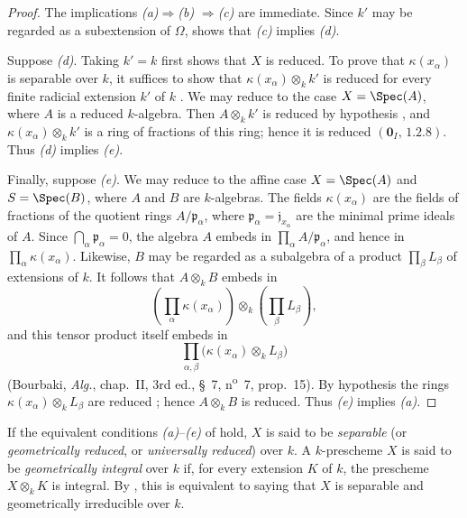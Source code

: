 \begin{proof}
The implications \emph{(a)}$\Rightarrow$\emph{(b)}
$\Rightarrow$\emph{(c)} are immediate.
Since $k'$ may be regarded as a subextension of $\Omega$,
 shows that \emph{(c)} implies \emph{(d)}.

Suppose \emph{(d)}.
Taking $k'=k$ first shows that $X$ is reduced.
To prove that $\kappa(x_\alpha)$ is separable over $k$, it suffices to
show that $\kappa(x_\alpha)\otimes_k k'$ is reduced for every finite
radicial extension $k'$ of $k$ .
We may reduce to the case $X=\Spec(A)$, where $A$ is a reduced
$k$-algebra.
Then $A\otimes_k k'$ is reduced by hypothesis , and
$\kappa(x_\alpha)\otimes_k k'$ is a ring of fractions of this ring;
hence it is reduced $(\mathbf{0}_I,\,1.2.8)$.
Thus \emph{(d)} implies \emph{(e)}.

Finally, suppose \emph{(e)}.
We may reduce to the affine case
$X=\Spec(A)$ and $S=\Spec(B)$, where $A$ and $B$ are $k$-algebras.
The fields $\kappa(x_\alpha)$ are the fields of fractions of the
quotient rings $A/\mathfrak p_\alpha$, where
$\mathfrak p_\alpha=\mathfrak j_{x_\alpha}$ are the minimal prime
ideals of $A$.
Since $\bigcap_\alpha\mathfrak p_\alpha=0$, the algebra $A$ embeds in
$\prod_\alpha A/\mathfrak p_\alpha$, and hence in
$\prod_\alpha\kappa(x_\alpha)$.
Likewise, $B$ may be regarded as a subalgebra of a product
$\prod_\beta L_\beta$ of extensions of $k$.
It follows that $A\otimes_k B$ embeds in
\[
 \left(\prod_\alpha\kappa(x_\alpha)\right)
 \otimes_k
 \left(\prod_\beta L_\beta\right),
\]
and this tensor product itself embeds in
\[
 \prod_{\alpha,\beta}
 \bigl(\kappa(x_\alpha)\otimes_k L_\beta\bigr)
\]
(Bourbaki, \emph{Alg.}, chap.~II, 3rd ed., \S~7,
n\textsuperscript{o}~7, prop.~15).
By hypothesis the rings
$\kappa(x_\alpha)\otimes_k L_\beta$ are reduced
; hence $A\otimes_k B$ is reduced.
Thus \emph{(e)} implies \emph{(a)}.
\end{proof}

\begin{definition}[4.6.2]
\label{IV.4.6.2}
If the equivalent conditions \emph{(a)}--\emph{(e)} of
 hold, $X$ is said to be \emph{separable}
(or \emph{geometrically reduced}, or \emph{universally reduced}) over
$k$.
A $k$-prescheme $X$ is said to be \emph{geometrically integral} over
$k$ if, for every extension $K$ of $k$, the prescheme
$X\otimes_k K$ is integral.
By , this is equivalent to saying that $X$ is separable
and geometrically irreducible over $k$.
\end{definition}

